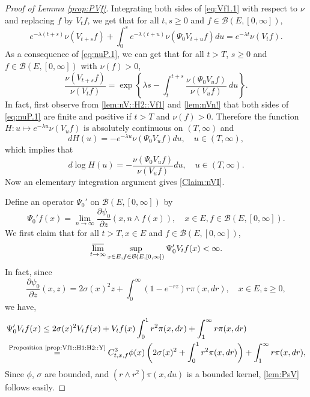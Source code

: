 \documentclass[12pt,a4paper]{amsart}
\numberwithin{equation}{section}
\theoremstyle{plain}
\theoremstyle{definition}
\theoremstyle{remark}
\begin{document}
\begin{proof}[Proof of Lemma \ref{prop:PVf}]
	
	Integrating  both sides of \eqref{eq:Vf1.1} with respect to $\nu$ and replacing $f$ by $V_t f$, we get that for all $t, s\geq 0$ and $f\in \mathcal B(E,[0,\infty])$,
\begin{equation}\label{eq:nuP.1}
	e^{- \lambda (t+s)} \nu(V_{t+s}f) + \int_0^s e^{- \lambda (t+u)} \nu(\Psi_0 V_{t+u}f) du
	= e^{- \lambda t} \nu(V_t f).
\end{equation}
	As a consequence of \eqref{eq:nuP.1}, we can get that for all $t>T$, $s\geq 0$ and $f \in \mathcal B(E,[0,\infty])$ with $\nu(f)>0$,
\begin{equation}\label{Claim:nVI}
	\frac{\nu(V_{t+s} f)} {\nu(V_t f)}
	= \exp\left\{ \lambda s - \int_t^{t+s} \frac{\nu(\Psi_0 V_u f) }{\nu(V_u f)} ~du\right\}.
\end{equation}
	In fact, first observe from \eqref{lem:nV::H2::Vf1} and \eqref{lem:nVn!} that both sides of \eqref{eq:nuP.1} are finite and positive if $t> T$ and $\nu(f)>0$.
	Therefore the function $H: u\mapsto e^{-\lambda u}\nu(V_u f)$ is absolutely continuous on $(T,\infty)$ and
\begin{equation}
	d H(u)
	= - e^{- \lambda u} \nu(\Psi_0 V_u f) du,
	\quad u\in (T,\infty),
\end{equation}
	which implies that
\begin{equation}
	d \log H(u)
	= - \frac{\nu(\Psi_0 V_u f )}{ \nu(V_u f)} du,
	\quad u \in (T,\infty).
\end{equation}
	Now an elementary integration argument gives \eqref{Claim:nVI}.
	
	Define an operator $\Psi_0'$ on $\mathcal B(E,[0,\infty])$ by
\begin{equation}
	\Psi_0' f(x)
	= \lim_{n\to \infty}\frac{\partial \psi_0}{ \partial z} (x, n\wedge f(x)),
	\quad x\in E, f\in \mathcal B(E,[0,\infty]).
\end{equation}
	We first claim that for all $t> T, x\in E$ and $f\in \mathcal B(E,[0,\infty])$,
\begin{equation}\label{lem:PsV}
	\varlimsup_{t\to \infty} \sup_{x\in E, f\in \mathcal B(E, [0,\infty])}\Psi_0'V_tf(x) < \infty.
\end{equation}
	In fact, since
\begin{equation}\label{e:derofpsi0-2}
	\frac{\partial \psi_0 }{ \partial z} (x,z)
	= 2\sigma (x)^2 z + \int_0^\infty (1 - e^{- rz}) r \pi(x,dr),
	\quad x\in E, z\geq 0,
\end{equation}
	we have,
\begin{align}
	&\Psi_0' V_tf(x)
	\leq 2\sigma (x)^2 V_t f(x) + V_t f(x) \int_0^1 r^2 \pi(x,dr) + \int_1^\infty r \pi(x,dr)
		\\&\overset{\text{Proposition \ref{prop:Vf1::H1:H2::Y}}}
	= C^3_{t,x,f}
	\phi(x) \left(2\sigma (x)^2 +\int_0^1 r^2 \pi(x,dr) \right)+ \int_1^\infty r \pi(x,dr),
\end{align}
	Since $\phi$, $\sigma$ are bounded,  and $(r\wedge r^2)\pi(x,du)$ is a bounded kernel, \eqref{lem:PsV} follows easily.
	

\end{proof}
\end{document}
